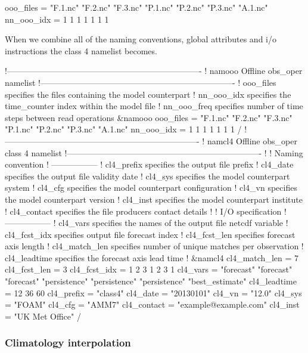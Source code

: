 \documentclass[../main/NEMO_manual]{subfiles}
\begin{document}
\begin{forlines}
   ooo_files = "F.1.nc" "F.2.nc" "F.3.nc" "P.1.nc" "P.2.nc" "P.3.nc" "A.1.nc"
   nn_ooo_idx = 1 1 1 1 1 1 1
\end{forlines}

When we combine all of the naming conventions, global attributes and i/o instructions the class 4 namelist becomes.

\begin{forlines}
!----------------------------------------------------------------------
!       namooo Offline obs_oper namelist
!----------------------------------------------------------------------
!   ooo_files    specifies the files containing the model counterpart
!   nn_ooo_idx   specifies the time_counter index within the model file
!   nn_ooo_freq  specifies number of time steps between read operations
&namooo
   ooo_files = "F.1.nc" "F.2.nc" "F.3.nc" "P.1.nc" "P.2.nc" "P.3.nc" "A.1.nc"
   nn_ooo_idx = 1 1 1 1 1 1 1
/
!----------------------------------------------------------------------
!       namcl4 Offline obs_oper class 4 namelist
!----------------------------------------------------------------------
!
!  Naming convention
!  -----------------
!  cl4_prefix    specifies the output file prefix
!  cl4_date      specifies the output file validity date
!  cl4_sys       specifies the model counterpart system
!  cl4_cfg       specifies the model counterpart configuration
!  cl4_vn        specifies the model counterpart version
!  cl4_inst      specifies the model counterpart institute
!  cl4_contact   specifies the file producers contact details
!
!  I/O specification
!  -----------------
!  cl4_vars      specifies the names of the output file netcdf variable
!  cl4_fcst_idx  specifies output file forecast index
!  cl4_fcst_len  specifies forecast axis length
!  cl4_match_len specifies number of unique matches per observation
!  cl4_leadtime  specifies the forecast axis lead time 
!
&namcl4
   cl4_match_len = 7
   cl4_fcst_len = 3
   cl4_fcst_idx = 1 2 3 1 2 3 1
   cl4_vars = "forecast" "forecast" "forecast" "persistence" "persistence"
              "persistence" "best_estimate"
   cl4_leadtime = 12 36 60
   cl4_prefix = "class4"
   cl4_date = "20130101"
   cl4_vn = "12.0"
   cl4_sys = "FOAM"
   cl4_cfg = "AMM7"
   cl4_contact = "example@example.com"
   cl4_inst = "UK Met Office"
/
\end{forlines}

\subsubsection{Climatology interpolation}
\end{document}
